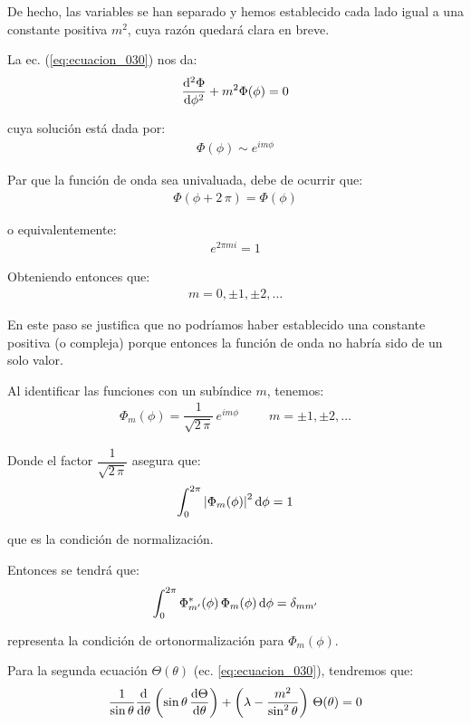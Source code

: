 De hecho, las variables se han separado y hemos establecido cada lado igual a una constante positiva $m^{2}$, cuya razón quedará clara en breve.
\par
La ec. (\ref{eq:ecuacion_030}) nos da:
\begin{align*}
\dv[2]{\Phi}{\phi} + m^{2} \Phi (\phi) = 0
\end{align*}

cuya solución está dada por:
\begin{align*}
\Phi(\phi) \sim e^{i m \phi}
\end{align*}

Par que la función de onda sea univaluada, debe de ocurrir que:
\begin{align}
 \Phi(\phi +  2 \, \pi) = \Phi(\phi)
 \label{eq:ecuacion_031}
\end{align}

o equivalentemente:
\begin{align*}
e^{2 \pi m i} = 1
\end{align*}

Obteniendo entonces que:
\begin{align*}
m = 0, \pm 1, \pm 2, \ldots
\end{align*}

En este paso se justifica que no podríamos haber establecido una constante positiva (o compleja) porque entonces la función de onda no habría sido de un solo valor.
\par
Al identificar las funciones con un subíndice $m$, tenemos:
\begin{align}
\Phi_{m}(\phi) = \dfrac{1}{\sqrt{2 \, \pi}} \, e^{i m \phi} \hspace{1cm} m = \pm 1, \pm 2, \ldots
\label{eq:ecuacion_032}
\end{align}

Donde el factor $\dfrac{1}{\sqrt{2 \, \pi}}$ asegura que:
\begin{align*}
\int_{0}^{2 \pi} \abs{\Phi_{m}(\phi)}^{2} \dd{\phi} = 1
\end{align*}

que es la condición de normalización.
\par
Entonces se tendrá que:
\begin{align}
\int_{0}^{2 \pi} \Phi_{{m}^{\prime}}^{*}(\phi) \, \Phi_{m}(\phi) \dd{\phi} = \delta_{m {m}^{\prime}}
\label{eq:ecuacion_033}
\end{align}

representa la condición de ortonormalización para $\Phi_{m}(\phi)$.
\par
Para la segunda ecuación $\Theta (\theta)$ (ec. \ref{eq:ecuacion_030}), tendremos que:
\begin{align}
\dfrac{1}{\sin \theta} \dv{\theta} \left( \sin \theta \, \dv{\Theta}{\theta} \right) + \left( \lambda - \dfrac{m^{2}}{\sin^{2} \theta} \right) \, \Theta (\theta) = 0
\label{eq:ecuacion_034}
\end{align}

